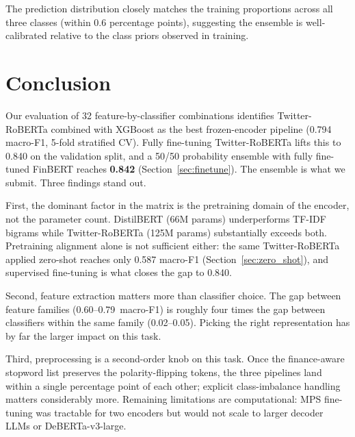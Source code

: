 \documentclass[12pt,a4paper]{article}
\begin{document}
The prediction distribution closely matches the training proportions across all three classes (within 0.6 percentage points), suggesting the ensemble is well-calibrated relative to the class priors observed in training.

\section{Conclusion}
\label{sec:conclusion}

Our evaluation of 32 feature-by-classifier combinations identifies Twitter-RoBERTa combined with XGBoost as the best frozen-encoder pipeline (0.794 macro-F1, 5-fold stratified CV). Fully fine-tuning Twitter-RoBERTa lifts this to 0.840 on the validation split, and a 50/50 probability ensemble with fully fine-tuned FinBERT reaches \textbf{0.842} (Section~\ref{sec:finetune}). The ensemble is what we submit. Three findings stand out.

First, the dominant factor in the matrix is the pretraining domain of the encoder, not the parameter count. DistilBERT (66M params) underperforms TF-IDF bigrams while Twitter-RoBERTa (125M params) substantially exceeds both. Pretraining alignment alone is not sufficient either: the same Twitter-RoBERTa applied zero-shot reaches only 0.587 macro-F1 (Section~\ref{sec:zero_shot}), and supervised fine-tuning is what closes the gap to 0.840.

Second, feature extraction matters more than classifier choice. The gap between feature families (0.60--0.79~macro-F1) is roughly four times the gap between classifiers within the same family (0.02--0.05). Picking the right representation has by far the larger impact on this task.

Third, preprocessing is a second-order knob on this task. Once the finance-aware stopword list preserves the polarity-flipping tokens, the three pipelines land within a single percentage point of each other; explicit class-imbalance handling matters considerably more. Remaining limitations are computational: MPS fine-tuning was tractable for two encoders but would not scale to larger decoder LLMs or DeBERTa-v3-large.

\clearpage
{}
\setcounter{page}{1}
\end{document}
